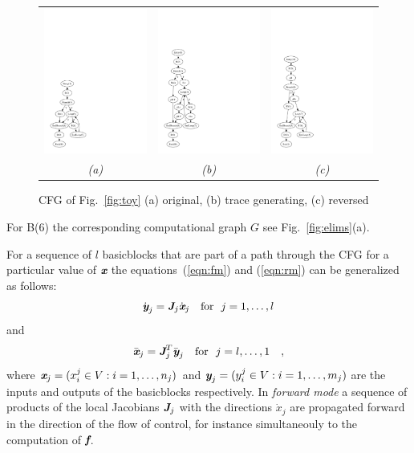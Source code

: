 \documentclass[11pt]{article}
\newcommand{\basicblock}{basicblock}
\newcommand{\bmf}{\mbox{\bf\em f}}
\newcommand{\bmJ}{\mbox{\bf\em J}}
\newcommand{\bmx}{\mbox{\bf\em x}}
\newcommand{\bmy}{\mbox{\bf\em y}}
\newcommand{\reffig}[1]{{Fig.~\ref{#1}}}
\begin{document}
\begin{figure}[ht]
\centering
\begin{tabular}{ccc}
\includegraphics[width=.25\textwidth]{cfg_ts}
&
\includegraphics[width=.25\textwidth]{cfg_tape}
&
\includegraphics[width=.25\textwidth]{cfg_adj}
\\
\em (a) & \em (b) & \em (c)
\end{tabular}
\caption{CFG of \reffig{fig:toy} (a) original, (b) trace generating, (c) reversed}\label{fig:cfg}
\end{figure}
For B(6) the corresponding computational graph $G$  see 
\reffig{fig:elims}(a).  

For a sequence of $l$ {\basicblock}s that are part of 
a path through the CFG for a particular value of $\bmx$ the 
equations~(\ref{eqn:fm}) and (\ref{eqn:rm}) can be generalized as follows:
\begin{equation} \label{eqn:bbfm}
\dot{\bmy}_j=\bmJ_j \dot{\bmx}_j \quad \text{for}~~j=1,\ldots,l
\end{equation} 
and 
\begin{equation} \label{eqn:bbrm}
\bar{\bmx}_j=\bmJ^T_j \bar{\bmy}_j \quad \text{for}~~j=l,\ldots,1\quad ,
\end{equation} 
where $\bmx_j = (x^j_i \in V :  i=1,\ldots,n_j)$ and
$\bmy_j = (y^j_i \in V : i=1,\ldots,m_j)$ are the inputs and outputs of the 
{\basicblock}s
respectively. 
In {\em forward mode} a sequence of 
products of the local Jacobians $\bmJ_j$ 
with the directions $\dot{x}_j$ 
are propagated forward in the direction of the flow of control, for 
instance simultaneouly to the computation of $\bmf$.
\end{document}
